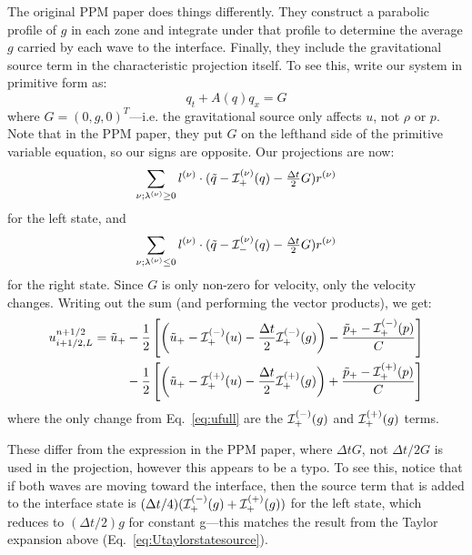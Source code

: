 The original PPM paper does things differently.  They construct a parabolic
profile of $g$ in each zone and integrate under that profile to determine
the average $g$ carried by each wave to the interface.  Finally, they include
the gravitational source term in the characteristic projection itself.
To see this, write our system in primitive form as:
\begin{equation}
q_t + A(q) q_x = G
\end{equation}
where $G = (0, g, 0)^T$---i.e. the gravitational source only affects
$u$, not $\rho$ or $p$.  Note that in the PPM paper, they put $G$ on
the lefthand side of the primitive variable equation, so our signs are
opposite.  Our projections are now:
\begin{equation}
\sum_{\nu; \lambda^{(\nu)} \ge 0}l^{(\nu)} \cdot (\tilde{q} - {\mathcal{I}}^{(\nu)}_+(q) - \tfrac{\Delta t}{2} G) r^{(\nu)}
\end{equation}
for the left state, and
\begin{equation}
\sum_{\nu; \lambda^{(\nu)} \le 0} l^{(\nu)} \cdot (\tilde{q} - {\mathcal{I}}^{(\nu)}_-(q) - \tfrac{\Delta t}{2} G) r^{(\nu)}
\end{equation}
for the right state.  Since $G$ is only non-zero for velocity, only
the velocity changes.  Writing out the sum (and performing the vector products), we
get:
\begin{align}
u_{i+1/2,L}^{n+1/2} =
   \tilde{u}_+
  &- \frac{1}{2} \left [
      \left (\tilde{u}_+ - {\mathcal{I}}_+^{(-)}(u) - \frac{\Delta t}{2} {\mathcal{I}}^{(-)}_+(g) \right ) -
       \frac{\tilde{p}_+ - {\mathcal{I}}_+^{(-)}(p)}{C} \right ] \nonumber \\
  &- \frac{1}{2} \left [
      \left (\tilde{u}_+ - {\mathcal{I}}_+^{(+)}(u) - \frac{\Delta t}{2} {\mathcal{I}}^{(+)}_+(g) \right ) +
       \frac{\tilde{p}_+ - {\mathcal{I}}_+^{(+)}(p)}{C} \right ]
\end{align}
where the only change from Eq.~\ref{eq:ufull} are the
${\mathcal{I}}^{(-)}_+(g)$ and ${\mathcal{I}}^{(+)}_+(g)$ terms.

These differ from the expression in the PPM paper, where $\Delta t G$,
not $\Delta t/2 G$ is used in the projection, however this appears to
be a typo.  To see this, notice that if both waves are moving toward
the interface, then the source term that is added to the interface
state is $(\Delta t/4) ({\mathcal{I}}_+^{(-)}(g) +
{\mathcal{I}}_+^{(+)}(g))$ for the left state, which reduces to $(\Delta
t/2) g$ for constant g---this matches the result from the Taylor
expansion above (Eq.~\ref{eq:Utaylorstatesource}).


